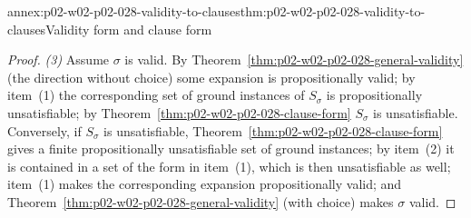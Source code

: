 \begin{annexitem}{annex:p02-w02-p02-028-validity-to-clauses}{thm:p02-w02-p02-028-validity-to-clauses}{Validity form and clause form}
\begin{proof}
\emph{(3)}  Assume \(\sigma\) is valid.  By
Theorem~\ref{thm:p02-w02-p02-028-general-validity} (the direction without
choice) some expansion is propositionally valid; by item~(1) the
corresponding set of ground instances of \(S_\sigma\) is propositionally
unsatisfiable; by Theorem~\ref{thm:p02-w02-p02-028-clause-form} \(S_\sigma\)
is unsatisfiable.  Conversely, if \(S_\sigma\) is unsatisfiable,
Theorem~\ref{thm:p02-w02-p02-028-clause-form} gives a finite
propositionally unsatisfiable set of ground instances; by item~(2) it is
contained in a set of the form in item~(1), which is then unsatisfiable as
well; item~(1) makes the corresponding expansion propositionally valid; and
Theorem~\ref{thm:p02-w02-p02-028-general-validity} (with choice) makes
\(\sigma\) valid.
\end{proof}
\end{annexitem}


